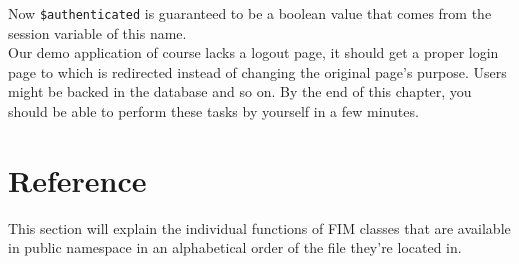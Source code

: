 \documentclass{scrartcl}
\begin{document}
      \begin{phpcode*}{firstnumber=6,frame=bottomline,startinline}
   /**
    * @param string $fileName
    * @param string $fullName
    * @param bool $authenticated session
    */
   public function checkReading($fileName, $fullName, $authenticated) {
      if($fileName !== '.' && !$authenticated)
         return false;
   }
}
      \end{phpcode*}
      Now \lstinline!$authenticated! is guaranteed to be a boolean value that comes from the session variable of this name. \\
      Our demo application of course lacks a logout page, it should get a proper login page to which is redirected instead of changing the original page's purpose. Users might be backed in the database and so on. By the end of this chapter, you should be able to perform these tasks by yourself in a few minutes.
   \section{Reference}
      This section will explain the individual functions of FIM classes that are available in public namespace in an alphabetical order of the file they're located in.
\end{document}

